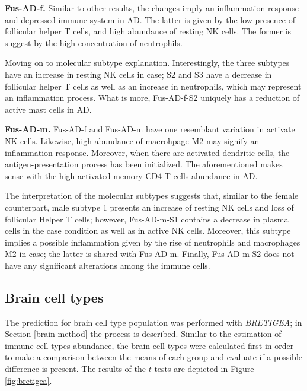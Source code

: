 \textbf{Fus-AD-f.} Similar to other results, the changes imply an inflammation response and depressed immune system in AD. The latter is given by the low presence of follicular helper T cells, and high abundance of resting NK cells. The former is suggest by the high concentration of neutrophils. 

Moving on to molecular subtype explanation. Interestingly, the three subtypes have an increase in resting NK cells in case; S2 and S3 have a decrease in follicular helper T cells as well as an increase in neutrophils, which may represent an inflammation process. What is more, Fus-AD-f-S2 uniquely has a reduction of active mast cells in AD.

\textbf{Fus-AD-m.} Fus-AD-f and Fus-AD-m have one resemblant variation in activate NK cells. Likewise, high abundance of macrohpage M2 may signify an inflammation response. Moreover, when there are activated dendritic cells, the antigen-presentation process has been initialized. The aforementioned makes sense with the high activated memory CD4 T cells abundance in AD.

The interpretation of the molecular subtypes suggests that, similar to the female counterpart, male subtype 1 presents an increase of resting NK cells and loss of follicular Helper T cells; however, Fus-AD-m-S1 contains a decrease in plasma cells in the case condition as well as in active NK cells. Moreover, this subtype implies a possible inflammation given by the rise of neutrophils and macrophages M2 in case; the latter is shared with Fus-AD-m. Finally, Fus-AD-m-S2 does not have any significant alterations among the immune cells.

\subsection{Brain cell types}

The prediction for brain cell type population was performed with \textit{BRETIGEA}; in Section \ref{brain-method} the process is described. Similar to the estimation of immune cell types abundance, the brain cell types were calculated first in order to make a comparison between the means of each group and evaluate if a possible difference is present. The results of the $t$-tests are depicted in Figure \ref{fig:bretigea}.

